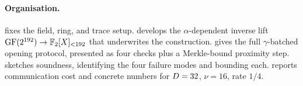 \paragraph{Organisation.}  fixes the field, ring, and
trace setup.  develops the $\alpha$-dependent inverse
lift $\mathrm{GF}(2^{192}) \to \mathbb{F}_2[X]_{<192}$ that underwrites the construction.
 gives the full $\gamma$-batched opening
protocol, presented as four checks plus a Merkle-bound proximity step.
 sketches soundness, identifying the four failure
modes and bounding each.  reports communication cost
and concrete numbers for $D = 32$, $\nu = 16$, rate $1/4$.
